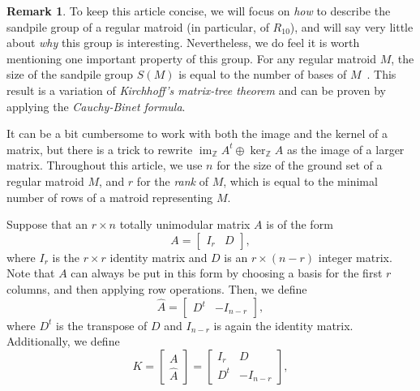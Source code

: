 \documentclass[12p]{amsart}
\numberwithin{equation}{section}
\theoremstyle{plain}
\theoremstyle{definition}
\newtheorem{remark}[thm]{Remark}
\newcommand{\Z}{\mathbb {Z}}
\DeclareMathOperator{\im}{im}
\begin{document}
\begin{remark}\label{rem:mtt}
    To keep this article concise, we will focus on \emph{how} to describe the sandpile group of a regular matroid (in particular, of $R_{10}$), and will say very little about \emph{why} this group is interesting. Nevertheless, we do feel it is worth mentioning one important property of this group. For any regular matroid $M$, the size of the sandpile group $S(M)$ is equal to the number of bases of $M$~\cite[Theorem 3.3.2]{Merino}. This result is a variation of \emph{Kirchhoff's matrix-tree theorem} and can be proven by applying the \emph{Cauchy-Binet formula}. 
\end{remark}

It can be a bit cumbersome to work with both the image and the kernel of a matrix, but there is a trick to rewrite $\im_ {\Z} A^t\oplus \ker_ {\Z} A$ as the image of a larger matrix. Throughout this article, we use $n$ for the size of the ground set of a regular matroid $M$, and $r$ for the \emph{rank} of $M$, which is equal to the minimal number of rows of a matroid representing $M$.

Suppose that an $r \times n$ totally unimodular matrix $A$ is of the form \begin{equation}\label{eq:stand_form} A = \begin{bmatrix} I_r & D\end{bmatrix},\end{equation}
where $I_r$ is the $r\times r$ identity matrix and $D$ is an $r \times (n-r)$ integer matrix. Note that $A$ can always be put in this form by choosing a basis for the first $r$ columns, and then applying row operations. Then, we define \begin{equation}\label{eq:dual_form}\widehat A = \begin{bmatrix} D^t & -I_{n-r}\end{bmatrix},\end{equation} where $D^t$ is the transpose of $D$ and $I_{n-r}$ is again the identity matrix. Additionally, we define \begin{equation}\label{eq:combo_form}K = \begin{bmatrix} A \\ \widehat A \end{bmatrix} = \begin{bmatrix}I_r & D \\D^t & -I_{n-r}\end{bmatrix},\end{equation}
\end{document}
